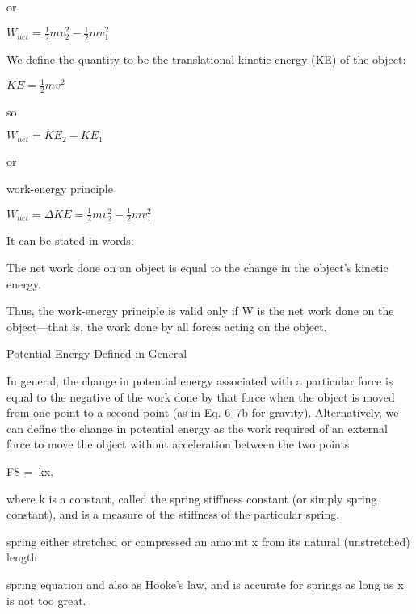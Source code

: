 \documentclass{extarticle}
\begin{document}
or

$W_{net} = \frac{1}{2}mv_2^2 - \frac{1}{2}mv_1^2$


We define the quantity
to be the translational kinetic energy (KE) of the object:

$KE = \frac{1}{2}mv^2$

so 

$W_{net} = {KE}_2 - {KE}_1$

or 

work-energy principle

$W_{net} = \Delta KE = \frac{1}{2}mv_2^2 - \frac{1}{2}mv_1^2$

It can be stated in words:

The net work done on an object is equal to the change in the object’s
kinetic energy.


Thus, the work-energy principle is valid only if W is the net work done on the object—that is, the work done by all forces acting on the object.















Potential Energy Defined in General

In general, the change in potential energy
associated with a particular force is equal to the negative of the work done by
that force when the object is moved from one point to a second point (as in Eq. 6–7b
for gravity). Alternatively, we can define the change in potential energy as the
work required of an external force to move the object without acceleration between
the two points


















FS =–kx.

where k is a constant, called the spring stiffness constant (or simply spring constant),
and is a measure of the stiffness of the particular spring.

spring either
stretched or compressed an amount x from its natural (unstretched) length


spring equation and
also as Hooke’s law, and is accurate for springs as long as x is not too great.
\end{document}
